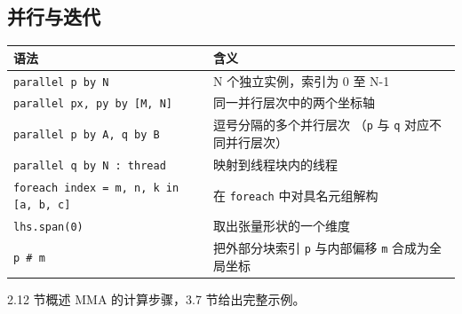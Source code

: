 \subsection*{并行与迭代}

\begin{table}[htbp]\centering\small
\begin{tabularx}{\linewidth}{@{}lX@{}}
\toprule
\textbf{语法} & \textbf{含义} \\
\midrule
\texttt{parallel p by N} & N 个独立实例，索引为 0 至 N-1 \\
\texttt{parallel px, py by [M, N]} & 同一并行层次中的两个坐标轴 \\
\texttt{parallel p by A, q by B} & 逗号分隔的多个并行层次 \newline{}（\texttt{p} 与 \texttt{q} 对应不同并行层次） \\
\texttt{parallel q by N : thread} & 映射到线程块内的线程 \\
\texttt{foreach index = m, n, k in [a, b, c]} & 在 \texttt{foreach} 中对具名元组解构 \\
\texttt{lhs.span(0)} & 取出张量形状的一个维度 \\
\texttt{p \# m} & 把外部分块索引 \texttt{p} 与内部偏移 \texttt{m} 合成为全局坐标 \\
\bottomrule
\end{tabularx}
\end{table}

2.12 节概述 MMA 的计算步骤，3.7 节给出完整示例。
